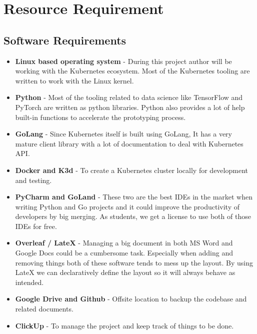 \section{Resource Requirement}

\subsection{Software Requirements}

\begin{itemize}[noitemsep,nolistsep] 
\item \textbf{Linux based operating system} - During this project author will be working with the Kubernetes ecosystem. Most of the Kubernetes tooling are written to work with the Linux kernel.
\item \textbf{Python} - Most of the tooling related to data science like TensorFlow and PyTorch are written as python libraries. Python also provides a lot of help built-in functions to  accelerate the prototyping process.
\item \textbf{GoLang} - Since Kubernetes itself is built using GoLang, It has a very mature client library with a lot of documentation to deal with Kubernetes API.
\item \textbf{Docker and K3d} - To create a Kubernetes cluster locally for development and testing.
\item \textbf{PyCharm and GoLand} - These two are the best IDEs in the market when writing Python and Go projects and it could improve the productivity of developers by big merging. As students, we get a license to use both of those IDEs for free.
\item \textbf{Overleaf / LateX}  - Managing a big document in both MS Word and Google Docs could be a cumbersome task. Especially when adding and removing things both of these software tends to mess up the layout. By using LateX we can declaratively define the layout so it will always behave as intended.
\item \textbf{Google Drive and Github} - Offsite location to backup the codebase and related documents.
\item \textbf{ClickUp} - To manage the project and keep track of things to be done.
\end{itemize}

